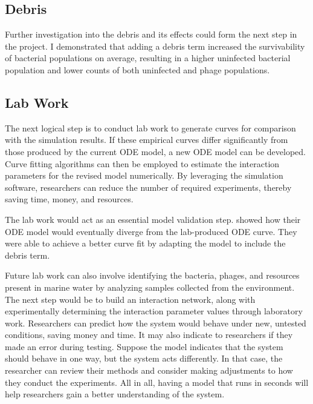 \subsection{Debris}
Further investigation into the debris and its effects could form the next step in the project.
I demonstrated that adding a debris term increased the survivability of bacterial populations on average, resulting in a higher uninfected bacterial population and lower counts of both uninfected and phage populations.

\subsection{Lab Work}
The next logical step is to conduct lab work to generate curves for comparison with the simulation results. 
If these empirical curves differ significantly from those produced by the current ODE model, a new ODE model can be developed. 
Curve fitting algorithms can then be employed to estimate the interaction parameters for the revised model numerically. 
By leveraging the simulation software, researchers can reduce the number of required experiments, thereby saving time, money, and resources.

The lab work would act as an essential model validation step. 
\citet{deyEmergentHigherorderInteractions2025} showed how their ODE model would eventually diverge from the lab-produced ODE curve. 
They were able to achieve a better curve fit by adapting the model to include the debris term. 

Future lab work can also involve identifying the bacteria, phages, and resources present in marine water by analyzing samples collected from the environment. 
The next step would be to build an interaction network, along with experimentally determining the interaction parameter values through laboratory work. 
Researchers can predict how the system would behave under new, untested conditions, saving money and time. 
It may also indicate to researchers if they made an error during testing. 
Suppose the model indicates that the system should behave in one way, but the system acts differently. In that case, the researcher can review their methods and consider making adjustments to how they conduct the experiments. 
All in all, having a model that runs in seconds will help researchers gain a better understanding of the system. 

